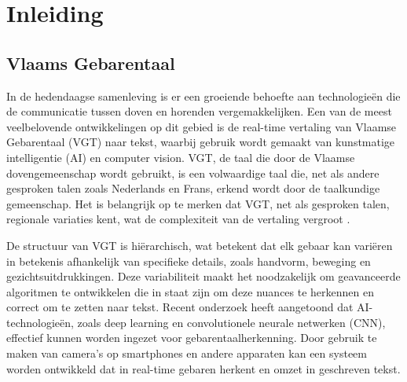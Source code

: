 


% 
\section{Inleiding}%
\label{sec:inleiding}

\subsection{Vlaams Gebarentaal}
\label{sec:VGT}

In de hedendaagse samenleving is er een groeiende behoefte aan technologieën die de communicatie tussen doven en horenden vergemakkelijken. Een van de meest veelbelovende ontwikkelingen op dit gebied is de real-time vertaling van Vlaamse Gebarentaal (VGT) naar tekst, waarbij gebruik wordt gemaakt van kunstmatige intelligentie (AI) en computer vision. VGT, de taal die door de Vlaamse dovengemeenschap wordt gebruikt, is een volwaardige taal die, net als andere gesproken talen zoals Nederlands en Frans, erkend wordt door de taalkundige gemeenschap. Het is belangrijk op te merken dat VGT, net als gesproken talen, regionale variaties kent, wat de complexiteit van de vertaling vergroot \autocite{vanmeerbergen2000simultane}.

De structuur van VGT is hiërarchisch, wat betekent dat elk gebaar kan variëren in betekenis afhankelijk van specifieke details, zoals handvorm, beweging en gezichtsuitdrukkingen. \autocite{469340}
Deze variabiliteit maakt het noodzakelijk om geavanceerde algoritmen te ontwikkelen die in staat zijn om deze nuances te herkennen en correct om te zetten naar tekst. 
Recent onderzoek heeft aangetoond dat AI-technologieën, zoals deep learning en convolutionele neurale netwerken (CNN), effectief kunnen worden ingezet voor gebarentaalherkenning.\autocite{10.52756/ijerr.2023.v34spl.004}\autocite{10.17485/ijst/v16i45.2583}
Door gebruik te maken van camera's op smartphones en andere apparaten kan een systeem worden ontwikkeld dat in real-time gebaren herkent en omzet in geschreven tekst.
